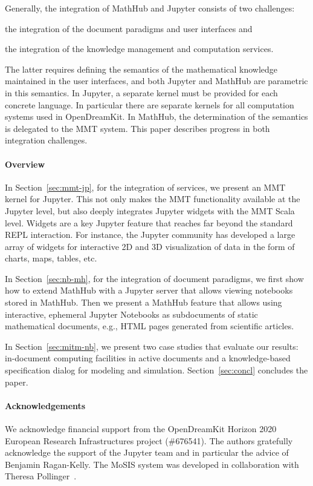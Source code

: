 Generally, the integration of MathHub and Jupyter consists of two challenges:
\begin{compactenum}[\em i\rm )]
\item the integration of the document paradigms and user interfaces 
and
\item the integration of the knowledge management and computation services.
\end{compactenum}
The latter requires defining the semantics of the mathematical knowledge maintained in the user interfaces, and both Jupyter and MathHub are parametric in this semantics.
In Jupyter, a separate kernel must be provided for each concrete language.
In particular there are separate kernels for all computation systems used in OpenDreamKit.
In MathHub, the determination of the semantics is delegated to the MMT system. This paper describes progress in both integration challenges.

\paragraph{Overview} In Section~\ref{sec:mmt-jp}, for the integration of services, we present an MMT kernel for Jupyter.
This not only makes the MMT functionality available at the Jupyter level, but also deeply integrates Jupyter widgets with the MMT Scala level.
Widgets are a key Jupyter feature that reaches far beyond the standard REPL interaction.
For instance, the Jupyter community has developed a large array of widgets for interactive 2D and 3D visualization of data in the form of charts, maps, tables, etc.

In Section~\ref{sec:nb-mh}, for the integration of document paradigms, we first show how to extend MathHub with a Jupyter server that allows viewing notebooks stored in MathHub.
Then we present a MathHub feature that allows using interactive, ephemeral Jupyter Notebooks as subdocuments of static mathematical documents, e.g., HTML pages generated from scientific articles.

In Section~\ref{sec:mitm-nb}, we present two case studies that evaluate our results: in-document computing facilities in active documents and a knowledge-based specification dialog for modeling and simulation.
Section~\ref{sec:concl} concludes the paper.

\paragraph{Acknowledgements}
We acknowledge financial support from the OpenDreamKit Horizon 2020 European Research Infrastructures project (\#676541).
The authors gratefully acknowledge the support of the Jupyter team and in particular the advice of Benjamin Ragan-Kelly.
The MoSIS system was developed in collaboration with Theresa Pollinger~\cite{PolKohKoe:kacse18}.

